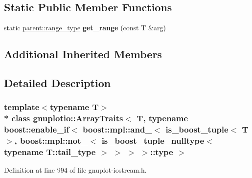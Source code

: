\subsection*{Static Public Member Functions}
\begin{DoxyCompactItemize}
\item 
static \hyperlink{structgnuplotio_1_1_error___was_not_container}{parent\+::range\+\_\+type} {\bfseries get\+\_\+range} (const T \&arg)\hypertarget{classgnuplotio_1_1_array_traits_3_01_t_00_01typename_01boost_1_1enable__if_3_01boost_1_1mpl_1_1a8de3a8fe198d85f7f5d28b9a2f5bf229_aec07e01edbb46f5f283d5b6af068c0f2}{}\label{classgnuplotio_1_1_array_traits_3_01_t_00_01typename_01boost_1_1enable__if_3_01boost_1_1mpl_1_1a8de3a8fe198d85f7f5d28b9a2f5bf229_aec07e01edbb46f5f283d5b6af068c0f2}

\end{DoxyCompactItemize}
\subsection*{Additional Inherited Members}


\subsection{Detailed Description}
\subsubsection*{template$<$typename T$>$\\*
class gnuplotio\+::\+Array\+Traits$<$ T, typename boost\+::enable\+\_\+if$<$ boost\+::mpl\+::and\+\_\+$<$ is\+\_\+boost\+\_\+tuple$<$ T $>$, boost\+::mpl\+::not\+\_\+$<$ is\+\_\+boost\+\_\+tuple\+\_\+nulltype$<$ typename T\+::tail\+\_\+type $>$ $>$ $>$ $>$\+::type $>$}



Definition at line 994 of file gnuplot-\/iostream.\+h.

